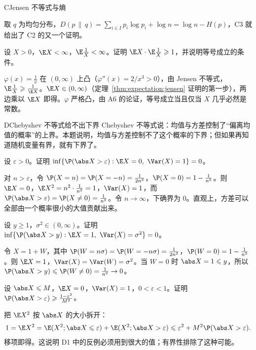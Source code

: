 \begin{probleme}{C}{Jensen 不等式与熵}
\begin{questions}
\begin{solution}
取 $q$ 为均匀分布，$D(p\,\|\,q)=\sum_{i\in I}p_i\log p_i+\log n=\log n-H(p)$，C3 就给出了 C2 的又一个证明。
\end{solution}

\item 设 $X>0$，$\E X<\infty$，$\E\frac1X<\infty$。证明 $\E X\cdot \E\frac1X\geqslant1$，并说明等号成立的条件。
\begin{solution}
$\varphi(x)=\frac1x$ 在 $(0,\infty)$ 上凸（$\varphi''(x)=2/x^3>0$），由 Jensen 不等式，$\E\frac1X\geqslant\frac1{\E X}$。$\E X\in(0,\infty)$（定理~\ref{thm:expectation:jensen} 证明的第一步），两边乘以 $\E X$ 即得。$\varphi$ 严格凸，由 A6 的论证，等号成立当且仅当 $X$ 几乎必然是常数。
\end{solution}
\end{questions}
\end{probleme}

\thinkingpart

\begin{probleme}[问题]{D}{Chebyshev 不等式给不出下界}
Chebyshev 不等式说：均值与方差控制了“偏离均值的概率”的上界。本题说明，均值与方差控制不了这个概率的下界；但如果再知道随机变量有界，就有下界了。
\begin{questions}
\item 设 $\varepsilon>0$。证明 $\inf\{\P(\abs X>\varepsilon):\E X=0,\ \Var(X)=1\}=0$。
\begin{solution}
对 $n>\varepsilon$，令 $\P(X=n)=\P(X=-n)=\frac1{2n^2}$，$\P(X=0)=1-\frac1{n^2}$。则 $\E X=0$，$\E X^2=n^2\cdot\frac1{n^2}=1$，$\Var(X)=1$，而 $\P(\abs X>\varepsilon)=\P(X\neq0)=\frac1{n^2}$。令 $n\to\infty$，下确界为 $0$。直观上，方差可以全部由一个概率很小的大值贡献出来。
\end{solution}

\item 设 $y\geqslant1$，$\sigma^2\in(0,\infty)$。证明 $\inf\{\P(\abs X>y):\E X=1,\ \Var(X)=\sigma^2\}=0$。
\begin{solution}
令 $X=1+W$，其中 $\P(W=n\sigma)=\P(W=-n\sigma)=\frac1{2n^2}$，$\P(W=0)=1-\frac1{n^2}$。则 $\E X=1$，$\Var(X)=\Var(W)=\sigma^2$。当 $W=0$ 时 $\abs X=1\leqslant y$，所以 $\P(\abs X>y)\leqslant \P(W\neq0)=\frac1{n^2}\to0$。
\end{solution}

\item 设 $\abs X\leqslant M$，$\E X=0$，$\Var(X)=1$，$0<\varepsilon<1$。证明 $\P(\abs X>\varepsilon)\geqslant\frac{1-\varepsilon^2}{M^2}$。
\begin{solution}
把 $\E X^2$ 按 $\abs X$ 的大小拆开：
\[
1=\E X^2=\E(X^2;\abs X\leqslant\varepsilon)+\E(X^2;\abs X>\varepsilon)\leqslant\varepsilon^2+M^2\P(\abs X>\varepsilon).
\]
移项即得。这说明 D1 中的反例必须用到很大的值；有界性排除了这种可能。
\end{solution}
\end{questions}
\end{probleme}

